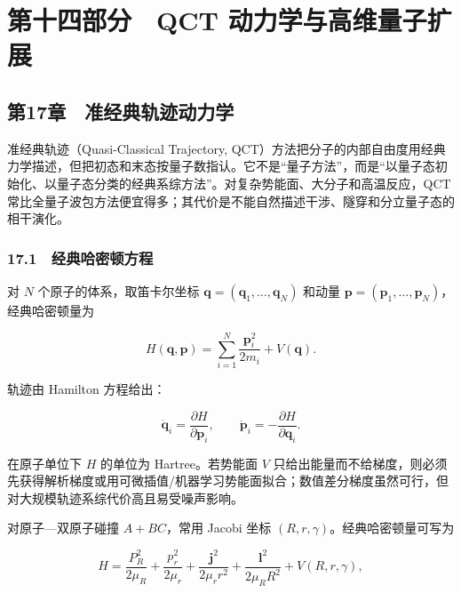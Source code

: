 \documentclass[
]{ctexbook}
\let\origsection\section
\renewcommand{\section}[1]{%
  \needspace{9\baselineskip}%
  \origsection{#1}%
}
\let\origsubsection\subsection
\renewcommand{\subsection}[1]{%
  \needspace{6\baselineskip}%
  \origsubsection{#1}%
}
\begin{document}
\hypertarget{ux7b2cux5341ux56dbux90e8ux5206-qct-ux52a8ux529bux5b66ux4e0eux9ad8ux7ef4ux91cfux5b50ux6269ux5c55}{%
\section{第十四部分　QCT
动力学与高维量子扩展}\label{ux7b2cux5341ux56dbux90e8ux5206-qct-ux52a8ux529bux5b66ux4e0eux9ad8ux7ef4ux91cfux5b50ux6269ux5c55}}

\hypertarget{ux7b2c17ux7ae0-ux51c6ux7ecfux5178ux8f68ux8ff9ux52a8ux529bux5b66}{%
\subsection{第17章　准经典轨迹动力学}\label{ux7b2c17ux7ae0-ux51c6ux7ecfux5178ux8f68ux8ff9ux52a8ux529bux5b66}}

准经典轨迹（Quasi-Classical Trajectory,
QCT）方法把分子的内部自由度用经典力学描述，但把初态和末态按量子数指认。它不是``量子方法''，而是``以量子态初始化、以量子态分类的经典系综方法''。对复杂势能面、大分子和高温反应，QCT
常比全量子波包方法便宜得多；其代价是不能自然描述干涉、隧穿和分立量子态的相干演化。

\hypertarget{ux7ecfux5178ux54c8ux5bc6ux987fux65b9ux7a0b}{%
\subsubsection{17.1　经典哈密顿方程}\label{ux7ecfux5178ux54c8ux5bc6ux987fux65b9ux7a0b}}

对 \(N\) 个原子的体系，取笛卡尔坐标
\(\mathbf q=(\mathbf q_1,\ldots,\mathbf q_N)\) 和动量
\(\mathbf p=(\mathbf p_1,\ldots,\mathbf p_N)\)，经典哈密顿量为

\[
H(\mathbf q,\mathbf p)
=
\sum_{i=1}^{N}
\frac{\mathbf p_i^2}{2m_i}
+
V(\mathbf q).
\]

轨迹由 Hamilton 方程给出：

\[
\dot{\mathbf q}_i=\frac{\partial H}{\partial \mathbf p_i},
\qquad
\dot{\mathbf p}_i=-\frac{\partial H}{\partial \mathbf q_i}.
\]

在原子单位下 \(H\) 的单位为 Hartree。若势能面 \(V\)
只给出能量而不给梯度，则必须先获得解析梯度或用可微插值/机器学习势能面拟合；数值差分梯度虽然可行，但对大规模轨迹系综代价高且易受噪声影响。

对原子---双原子碰撞 \(A+BC\)，常用 Jacobi 坐标
\((R,r,\gamma)\)。经典哈密顿量可写为

\[
H
=
\frac{P_R^2}{2\mu_R}
+
\frac{p_r^2}{2\mu_r}
+
\frac{\mathbf j^2}{2\mu_r r^2}
+
\frac{\mathbf l^2}{2\mu_R R^2}
+
V(R,r,\gamma),
\]
\end{document}
